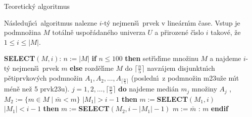 \subhead
Teoretick\'y algoritmus
\endsubhead
\smallskip

\flushpar N\'asleduj\'\i c\'\i\ algoritmus nalezne $i$-t\'y nejmen\v s\'\i\ 
prvek v line\'arn\'\i m \v case.  Vstup je podmno\v zina $M$ tot\'aln\v e 
uspo\v r\'adan\'eho univerza $U$ a p\v rirozen\'e \v c\'\i slo $i$ takov\'e, \v ze 
$1\le i\le |M|$.  
\medskip

{\bf SELECT$(M,i)$}:\newline 
$n:=|M|$\newline 
{\bf if} $n\le 100$ {\bf then}\newline 
\phantom{---}set\v r\'\i d\'\i me mno\v zinu $M$ a najdeme $i$-t\'y 
nejmen\v s\'\i\ prvek $m$\newline 
{\bf else}\newline
\phantom{---}rozd\v el\'\i me $M$ do $\lceil\frac n5\rceil$ navz\'ajem disjunktn\'\i ch p\v etiprvko\-v\'ych podmno\v zin\newline 
\phantom{---}$A_1,A_2,\dots,A_{\lceil\frac n5\rceil}$ (posledn\'\i\ z 
podmno\v zin m\accent23u\v ze m\'\i t m\'en\v e ne\v z 5 prvk\accent23u).\newline 
\phantom{---}{\bf for every} $j=1,2,\dots,\lceil\frac n5\rceil$ {\bf do}\newline 
\phantom{------}najdeme medi\'an $m_j$ mno\v ziny $A_j$\newline 
{}, $M_2:=\{m\in M\mid\bar {m}<m\}$\newline 
\phantom{---}{\bf if} $|M_1|>i-1$ {\bf then}\newline 
\phantom{------}$m:=${\bf SELECT}$(M_1,i)$\newline 
\phantom{---}{\bf else}\newline 
\phantom{------}{\bf if} $|M_1|<i-1$ {\bf then}\newline 
\phantom{---------}$m:=${\bf SELECT}$(M_2,i-|M_1|-1)$\newline 
\phantom{------}{\bf else}\newline 
\phantom{---------}$m:=\bar {m}$\newline 
\phantom{------}{\bf endif}\newline 
\phantom{---}{\bf endif}\newline 
\phantom{---}{\bf V\'ystup}: $m$\newline 
{\bf endif}
\medskip

